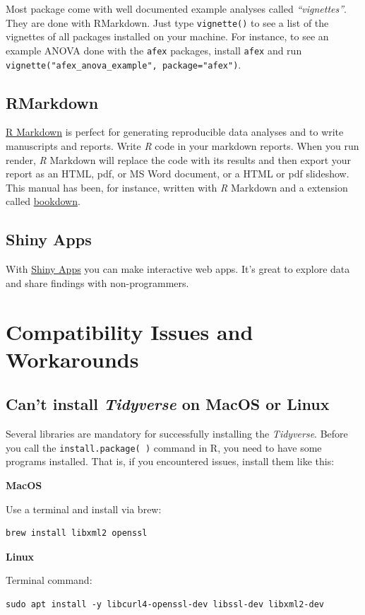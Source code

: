 \documentclass[
]{scrartcl}
\begin{document}
Most package come with well documented example analyses called \emph{``vignettes''}. They are done with RMarkdown. Just type \texttt{vignette()} to see a list of the vignettes of all packages installed on your machine. For instance, to see an example ANOVA done with the \texttt{afex} packages, install \texttt{afex} and run \texttt{vignette("afex\_anova\_example",\ package="afex")}.

\subsection*{RMarkdown}\label{rmarkdown}

\href{https://rmarkdown.rstudio.com/}{R Markdown} is perfect for generating reproducible data analyses and to write manuscripts and reports. Write \emph{R} code in your markdown reports. When you run render, \emph{R} Markdown will replace the code with its results and then export your report as an HTML, pdf, or MS Word document, or a HTML or pdf slideshow. This manual has been, for instance, written with \emph{R} Markdown and a extension called \href{https://www.bookdown.org/}{bookdown}.

\subsection*{Shiny Apps}\label{shiny-apps}

With \href{https://shiny.rstudio.com/}{Shiny Apps} you can make interactive web apps. It's great to explore data and share findings with non-programmers.

\section{Compatibility Issues and Workarounds}\label{compatibility-issues-and-workarounds}

\subsection{\texorpdfstring{Can't install \emph{Tidyverse} on MacOS or Linux}{Can't install Tidyverse on MacOS or Linux}}\label{tidyverseinstall}

Several libraries are mandatory for successfully installing the \emph{Tidyverse}. Before you call the \texttt{install.package(\ )} command in R, you need to have some programs installed. That is, if you encountered issues, install them like this:

\textbf{MacOS}

Use a terminal and install via brew:

\begin{verbatim}
brew install libxml2 openssl
\end{verbatim}

\textbf{Linux}

Terminal command:

\begin{verbatim}
sudo apt install -y libcurl4-openssl-dev libssl-dev libxml2-dev
\end{verbatim}
\end{document}
